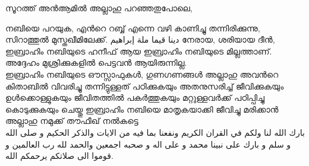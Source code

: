  സൂറത്ത് അൻആമിൽ  അല്ലാഹു പറഞ്ഞതുപോലെ, 

    \textarabic{\quranayah[6][161]} 

നബിയെ പറയുക, എൻറെ റബ്ബ് 
എന്നെ വഴി കാണിച്ചു തന്നിരിക്കുന്നു, 
സിറാത്തുൽ മുസ്തഖീമിലേക്ക്. 
\textarabic{دينا قيما ملة إبراهيم}
നേരായ, ശരിയായ ദീൻ,  ഇബ്രാഹിം നബിയുടെ ഹനീഫ് ആയ ഇബ്രാഹിം നബിയുടെ മില്ലത്താണ്. 
അദ്ദേഹം മുശ്രിക്കുകളിൽ പെട്ടവൻ ആയിരുന്നില്ല. \\


ഇബ്രാഹിം നബിയുടെ ഔസ്സാഫുകൾ, ഗുണഗണങ്ങൾ 
അല്ലാഹു അവൻറെ കിതാബിൽ വിവരിച്ചു തന്നിട്ടുള്ളത് പഠിക്കുകയും അതനുസരിച്ച് ജീവിക്കുകയും 
ഉൾക്കൊള്ളുകയും ജീവിതത്തിൽ പകർത്തുകയും മറ്റുള്ളവർക്ക് പഠിപ്പിച്ചു കൊടുക്കുകയും ചെയ്തു ഇബ്രാഹിം നബിയെ മാതൃകയാക്കി ജീവിച്ചു മരിക്കാൻ അല്ലാഹു നമുക്ക് തൗഫീഖ് നൽകട്ടെ \\


\textarabic{بارك الله لنا ولكم في القران الكريم ونفعنا بما فيه من الايات والذكر الحكيم و صلى الله و سلم و بارك على نبينا محمد و على اله و صحبه اجمعين والحمد لله رب العالمين و قوموا الى صلاتكم يرحمكم الله.}


 